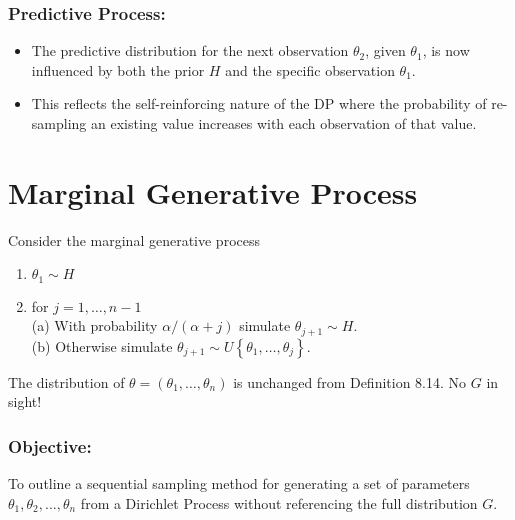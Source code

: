 \documentclass[10pt]{article}
\begin{document}
\subsubsection*{Predictive Process:}
\begin{itemize}
  \item The predictive distribution for the next observation \( \theta_2 \), given \( \theta_1 \), is now influenced by both the prior \( H \) and the specific observation \( \theta_1 \).
  \item This reflects the self-reinforcing nature of the DP where the probability of re-sampling an existing value increases with each observation of that value.
\end{itemize}

\section*{Marginal Generative Process}
Consider the marginal generative process

\begin{enumerate}
  \item $\theta_1 \sim H$
  \item for $j=1, \ldots, n-1$\\
(a) With probability $\alpha /(\alpha+j)$ simulate $\theta_{j+1} \sim H$.\\
(b) Otherwise simulate $\theta_{j+1} \sim U\left\{\theta_1, \ldots, \theta_j\right\}$.
\end{enumerate}

The distribution of $\theta=\left(\theta_1, \ldots, \theta_n\right)$ is unchanged from Definition 8.14. No $G$ in sight!

\subsubsection*{Objective:}
To outline a sequential sampling method for generating a set of parameters \( \theta_1, \theta_2, ..., \theta_n \) from a Dirichlet Process without referencing the full distribution \( G \).
\end{document}
